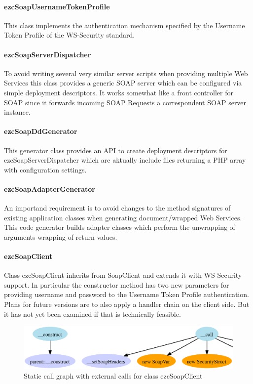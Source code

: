 \documentclass[10pt,final,a4paper,oneside]{article}
\begin{document}
\paragraph{ezcSoapUsernameTokenProfile}
This class implements the authentication mechanism
specified by the Username Token Profile
of the WS-Security standard.

\paragraph{ezcSoapServerDispatcher}
To avoid writing several very similar server scripts
when providing multiple Web Services
this class provides a generic SOAP server which
can be configured via simple deployment descriptors.
It works somewhat like a front controller for SOAP
since it forwards incoming SOAP Requests
a correspondent SOAP server instance.

\paragraph{ezcSoapDdGenerator}
This generator class provides an API
to create deployment descriptors for
ezcSoapServerDispatcher which are
aktually include files returning
a PHP array with configuration settings.

\paragraph{ezcSoapAdapterGenerator}
An importand requirement is
to avoid changes to the method signatures
of existing application classes
when generating document/wrapped Web Services.
This code generator builds adapter classes
which perform the unwrapping of arguments
wrapping of return values.

\paragraph{ezcSoapClient}
Class ezcSoapClient inherits from SoapClient
and extends it with WS-Security support.
In particular the constructor method
has two new parameters for providing username and password
to the Username Token Profile authentication.
Plans for future versions are to
also apply a handler chain on the client side.
But it has not yet been examined
if that is technically feasible.
\begin{figure}[htbp]
	\centering
		\includegraphics[width=1.00\textwidth]{figures/callgraph-SoapClient-class.SecureClient-with-external-calls.ps}
	\caption{Static call graph with external calls for class ezcSoapClient}
	\label{fig:callgraph-SoapClient-class.SecureClient-with-external-calls}
\end{figure}
\end{document}
